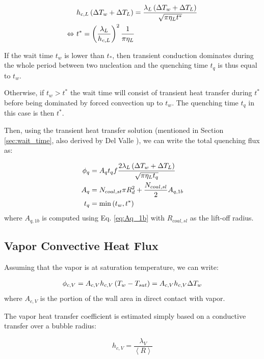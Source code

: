 \begin{align}
&h_{c,L}\left( \Delta T_{w} + \Delta T_{L} \right) = \frac{\lambda_{L}\left( \Delta T_{w} + \Delta T_{L} \right)}{\sqrt{\pi\eta_{L}t^{*}}}\\
\Leftrightarrow\  &t^{*} = \left( \frac{\lambda_{L}}{h_{c,L}} \right)^{2}\frac{1}{\pi \eta_{L}}
\label{eq:tstar}
\end{align}

If the wait time $t_{w}$ is lower than $t_{*}$, then transient conduction dominates during the whole period between two nucleation and the quenching time $t_{q}$ is thus equal to $t_{w}$.

Otherwise, if $t_{w}>t^{*}$ the wait time will consist of transient heat transfer during $t^{*}$ before being dominated by forced convection up to $t_{w}$. The quenching time $t_{q}$ in this case is then $t^{*}$.

Then, using the transient heat transfer solution (mentioned in Section \ref{sec:wait_time}, also derived by Del Valle \cite{del_valle_subcooled_1985}), we can write the total quenching flux as:

\begin{align}
\phi_{q} &= A_{q}t_{q}f \frac{2\lambda_{L}\left( \Delta T_{w} + \Delta T_{L} \right)}{\sqrt{\pi \eta_{L}t_{q}} }\\
A_{q} &= N_{coal,st} \pi R_{d}^{2} + \frac{N_{coal,sl}}{2} A_{q,1b} \\
t_{q} &= \mathrm{min}\left( t_{w}, t^{*} \right)
\end{align}
where $A_{q,1b}$ is computed using Eq. \ref{eq:Aq_1b} with $R_{coal,sl}$ as the lift-off radius.


\subsection{Vapor Convective Heat Flux}

Assuming that the vapor is at saturation temperature, we can write:

\begin{align}
\phi_{c,V} = A_{c,V} h_{c,V} \left( T_{w}-T_{sat} \right) = A_{c,V} h_{c,V} \Delta T_{w}
\end{align}
where $A_{c,V}$ is the portion of the wall area in direct contact with vapor.

\npar

The vapor heat transfer coefficient is estimated simply based on a conductive transfer over a bubble radius:

\begin{equation}
h_{c,V} = \dfrac{\lambda_{V}}{\left<R\right>}
\end{equation}

